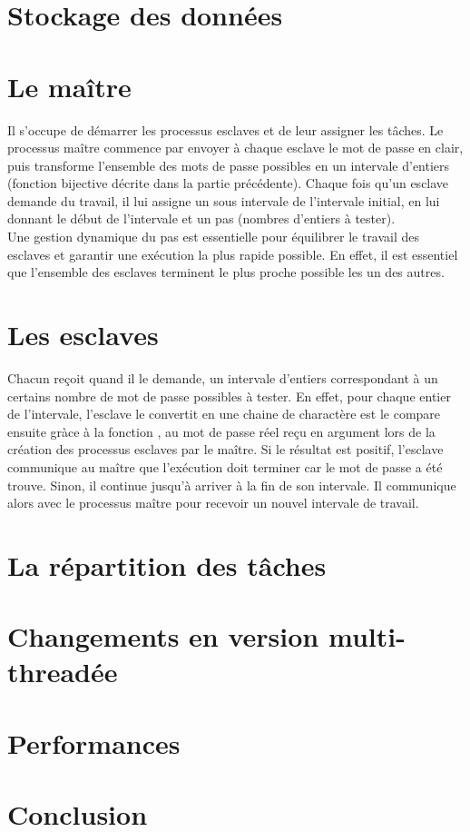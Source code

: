 \documentclass[a4paper,11pt]{article}
\begin{document}
\section{Stockage des données}

\section{Le maître}
Il s'occupe de démarrer les processus esclaves et de leur assigner les tâches. Le processus maître commence par envoyer à chaque esclave le mot de passe en clair, puis transforme l'ensemble des mots de passe possibles en un intervale d'entiers (fonction bijective décrite dans la partie précédente). Chaque fois qu'un esclave demande du travail, il lui assigne un sous intervale de l'intervale initial, en lui donnant le début de l'intervale et un pas (nombres d'entiers à tester).
\\
Une gestion dynamique du pas est essentielle pour équilibrer le travail des esclaves et garantir une exécution la plus rapide possible. En effet, il est essentiel que l'ensemble des esclaves terminent le plus proche possible les un des autres.

\section{Les esclaves}
Chacun reçoit quand il le demande, un intervale d'entiers correspondant à un certains nombre de mot de passe possibles à tester.
En effet, pour chaque entier de l'intervale, l'esclave le convertit en une chaine de charactère est le compare ensuite gràce à la fonction  , au mot de passe réel reçu en argument lors de la création des processus esclaves par le maître. Si le résultat est positif, l'esclave communique au maître que l'exécution doit terminer car le mot de passe a été trouve. Sinon, il continue jusqu'à arriver à la fin de son intervale. Il communique alors avec le processus maître pour recevoir un nouvel intervale de travail.


\section{La répartition des tâches}

\section{Changements en version multi-threadée}

\section{Performances}

\section{Conclusion}
\end{document}
